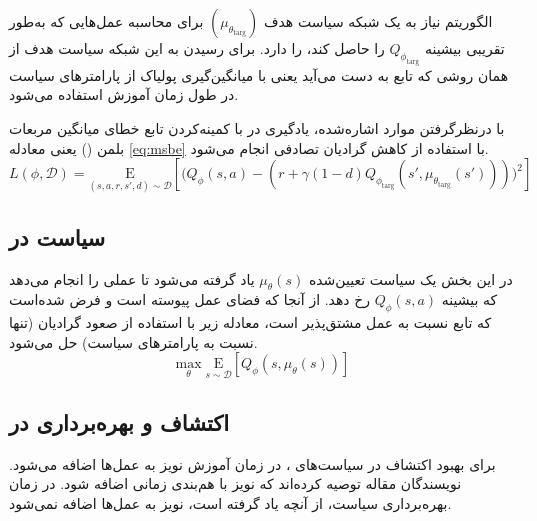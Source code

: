           
          الگوریتم
           نیاز به یک شبکه سیاست هدف
           $(\mu_{\theta_{\text{targ}}})$
            برای محاسبه عمل‌هایی که به‌طور تقریبی بیشینه
            $Q_{\phi_{\text{targ}}}$
             را حاصل کند، را دارد. برای رسیدن به این شبکه سیاست هدف
              از همان روشی که تابع  به دست می‌آید یعنی با میانگین‌گیری پولیاک از پارامترهای سیاست در طول زمان آموزش استفاده می‌شود.
          
          
          با درنظرگرفتن موارد اشاره‌شده، یادگیری  در  با کمینه‌کردن تابع خطای میانگین مربعات بلمن () یعنی معادله \eqref{eq:msbe} با استفاده از کاهش گرادیان تصادفی
           انجام می‌شود.
          \begin{equation}\label{eq:msbe}
          	L(\phi, {\mathcal D}) = \underset{(s,a,r,s',d) \sim {\mathcal D}}{{\mathrm E}}\left[
          	\Bigg( Q_{\phi}(s,a) - \left(r + \gamma (1 - d) Q_{\phi_{\text{targ}}}(s', \mu_{\theta_{\text{targ}}}(s')) \right) \Bigg)^2
          	\right]
          \end{equation}
          
          
          \subsection{ سیاست
          	در 
          }
  در این بخش یک سیاست تعیین‌شده 
  $\mu_{\theta}(s)$
   یاد گرفته می‌شود تا عملی را انجام می‌دهد که بیشینه 
   $Q_{\phi}(s,a)$
    رخ دهد. از آنجا که فضای عمل پیوسته است و فرض شده‌است که تابع  نسبت به عمل مشتق‌پذیر است، معادله زیر با استفاده از صعود گرادیان
     (تنها نسبت به پارامترهای سیاست) حل می‌شود.
     \begin{equation}
     	\max_{\theta} \underset{s \sim {\mathcal D}}{{\mathrm E}}\left[ Q_{\phi}(s, \mu_{\theta}(s)) \right]
     \end{equation}
     
     
     
     \subsection{اکتشاف و بهره‌برداری در 
     }
       برای بهبود اکتشاف
        در سیاست‌های ، در زمان آموزش نویز به عمل‌ها اضافه می‌شود. نویسندگان مقاله
          \cite{silver2014deterministic}
           توصیه کرده‌اند که نویز 
        با هم‌بندی زمانی اضافه شود.
        در زمان بهره‌برداری سیاست، از آنچه یاد گرفته است، نویز به عمل‌ها اضافه نمی‌شود.
        
